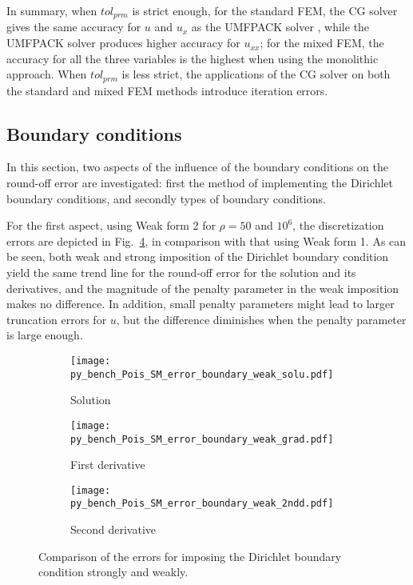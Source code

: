 \documentclass[review,3p]{elsarticle}
\begin{document}
In summary, when $tol_{prm}$ is strict enough, for the standard FEM, the CG solver gives the same accuracy for $u$ and $u_{x}$ as the UMFPACK solver , while the UMFPACK solver produces higher accuracy for $u_{xx}$; for the mixed FEM, the accuracy for all the three variables is the highest when using the monolithic approach. When $tol_{prm}$ is less strict, the applications of the CG solver on both the standard and mixed FEM methods introduce iteration errors.

\subsection{Boundary conditions}	\label{section_BC}

In this section, two aspects of the influence of the boundary conditions on the round-off error are investigated: first the method of implementing the Dirichlet boundary conditions, and secondly types of boundary conditions. 

For the first aspect, using Weak form 2 for $\rho=50$ and $10^6$, the discretization errors are depicted in Fig.~\ref{py_bench_Pois_SM_error_boundary_weak}, in comparison with that using Weak form 1. As can be seen, both weak and strong imposition of the Dirichlet boundary condition yield the same trend line for the round-off error for the solution and its derivatives, and the magnitude of the penalty parameter in the weak imposition makes no difference. In addition, small penalty parameters might lead to larger truncation errors for $u$, but the difference diminishes when the penalty parameter is large enough.

\begin{figure}[!ht]
    \begin{subfigure}{5.5cm}
        \texttt{[image: py\_bench\_Pois\_SM\_error\_boundary\_weak\_solu.pdf]}
        \caption{Solution}
        \label{py_bench_Pois_SM_error_boundary_weak_solu}
    \end{subfigure}
    \hspace{-0.2cm}
    \begin{subfigure}{5.5cm}
        \texttt{[image: py\_bench\_Pois\_SM\_error\_boundary\_weak\_grad.pdf]}
        \caption{First derivative}
        \label{py_bench_Pois_SM_error_boundary_weak_grad}
    \end{subfigure}
    \hspace{-0.2cm}
    \begin{subfigure}{5.5cm}
        \texttt{[image: py\_bench\_Pois\_SM\_error\_boundary\_weak\_2ndd.pdf]}
        \caption{Second derivative}
        \label{py_bench_Pois_SM_error_boundary_weak_2ndd}
    \end{subfigure}
\caption{Comparison of the errors for imposing the Dirichlet boundary condition strongly and weakly.}
\label{py_bench_Pois_SM_error_boundary_weak}
\end{figure}
\end{document}

